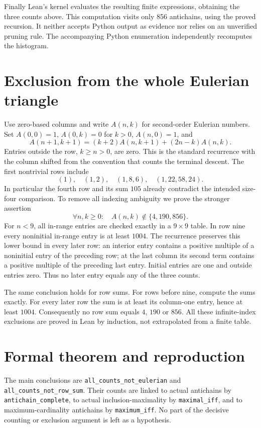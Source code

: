 \documentclass[11pt]{article}
\begin{document}
Finally Lean's kernel evaluates the resulting finite expressions, obtaining the three counts above. This computation visits only 856 antichains, using the proved recursion. It neither accepts Python output as evidence nor relies on an unverified pruning rule. The accompanying Python enumeration independently recomputes the histogram.

\section{Exclusion from the whole Eulerian triangle}
Use zero-based columns and write $A(n,k)$ for second-order Eulerian numbers. Set $A(0,0)=1$, $A(0,k)=0$ for $k>0$, $A(n,0)=1$, and
\[
 A(n+1,k+1)=(k+2)A(n,k+1)+(2n-k)A(n,k).
\]
Entries outside the row, $k\ge n>0$, are zero. This is the standard recurrence with the column shifted from the convention that counts the terminal descent. The first nontrivial rows include
\[
 (1),\quad(1,2),\quad(1,8,6),\quad(1,22,58,24).
\]
In particular the fourth row and its sum $105$ already contradict the intended size-four comparison. To remove all indexing ambiguity we prove the stronger assertion
\[
 \forall n,k\ge0:\quad A(n,k)\notin\{4,190,856\}.
\]
For $n<9$, all in-range entries are checked exactly in a $9\times9$ table. In row nine every noninitial in-range entry is at least $1004$. The recurrence preserves this lower bound in every later row: an interior entry contains a positive multiple of a noninitial entry of the preceding row; at the last column its second term contains a positive multiple of the preceding last entry. Initial entries are one and outside entries zero. Thus no later entry equals any of the three counts.

The same conclusion holds for row sums. For rows before nine, compute the sums exactly. For every later row the sum is at least its column-one entry, hence at least $1004$. Consequently no row sum equals $4$, $190$ or $856$. All these infinite-index exclusions are proved in Lean by induction, not extrapolated from a finite table.

\section{Formal theorem and reproduction}
The main conclusions are \texttt{all\_counts\_not\_eulerian} and \texttt{all\_counts\_not\_row\_sum}. Their counts are linked to actual antichains by \texttt{antichain\_complete}, to actual inclusion-maximality by \texttt{maximal\_iff}, and to maximum-cardinality antichains by \texttt{maximum\_iff}. No part of the decisive counting or exclusion argument is left as a hypothesis.
\end{document}
